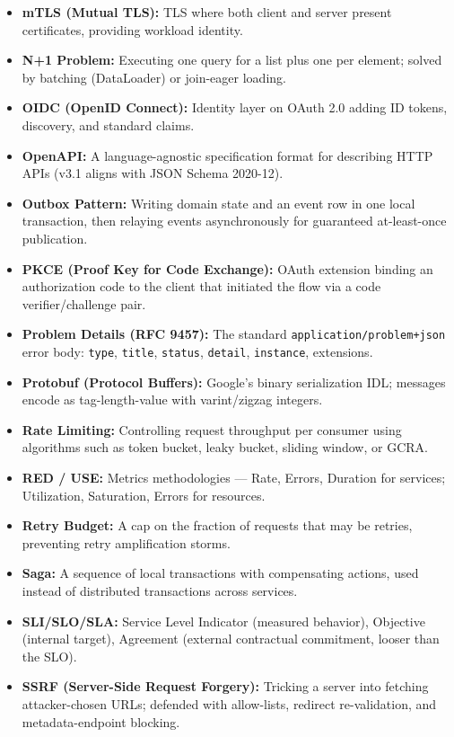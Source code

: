 \documentclass[12pt, a4paper, twoside, openright]{book}
\theoremstyle{definition}
\theoremstyle{remark}
\begin{document}
\begin{itemize}
  \item \textbf{mTLS (Mutual TLS):} TLS where both client and server present certificates, providing workload identity.
  \item \textbf{N+1 Problem:} Executing one query for a list plus one per element; solved by batching (DataLoader) or join-eager loading.
  \item \textbf{OIDC (OpenID Connect):} Identity layer on OAuth 2.0 adding ID tokens, discovery, and standard claims.
  \item \textbf{OpenAPI:} A language-agnostic specification format for describing HTTP APIs (v3.1 aligns with JSON Schema 2020-12).
  \item \textbf{Outbox Pattern:} Writing domain state and an event row in one local transaction, then relaying events asynchronously for guaranteed at-least-once publication.
  \item \textbf{PKCE (Proof Key for Code Exchange):} OAuth extension binding an authorization code to the client that initiated the flow via a code verifier/challenge pair.
  \item \textbf{Problem Details (RFC 9457):} The standard \texttt{application/problem+json} error body: \texttt{type}, \texttt{title}, \texttt{status}, \texttt{detail}, \texttt{instance}, extensions.
  \item \textbf{Protobuf (Protocol Buffers):} Google's binary serialization IDL; messages encode as tag-length-value with varint/zigzag integers.
  \item \textbf{Rate Limiting:} Controlling request throughput per consumer using algorithms such as token bucket, leaky bucket, sliding window, or GCRA.
  \item \textbf{RED / USE:} Metrics methodologies — Rate, Errors, Duration for services; Utilization, Saturation, Errors for resources.
  \item \textbf{Retry Budget:} A cap on the fraction of requests that may be retries, preventing retry amplification storms.
  \item \textbf{Saga:} A sequence of local transactions with compensating actions, used instead of distributed transactions across services.
  \item \textbf{SLI/SLO/SLA:} Service Level Indicator (measured behavior), Objective (internal target), Agreement (external contractual commitment, looser than the SLO).
  \item \textbf{SSRF (Server-Side Request Forgery):} Tricking a server into fetching attacker-chosen URLs; defended with allow-lists, redirect re-validation, and metadata-endpoint blocking.

\end{itemize}
\end{document}
